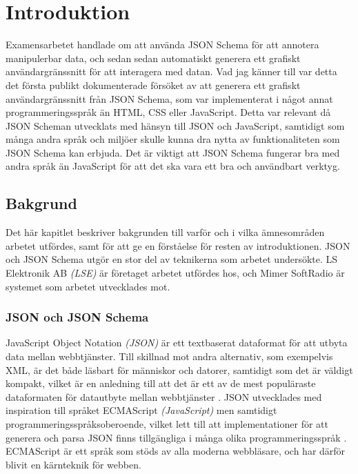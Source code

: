 \chapter{Introduktion}

Examensarbetet handlade om att använda JSON Schema för att annotera manipulerbar data, och sedan sedan automatiskt generera ett grafiskt användargränssnitt för att interagera med datan. Vad jag känner till var detta det första publikt dokumenterade försöket av att generera ett grafiskt användargränssnitt från JSON Schema, som var implementerat i något annat programmeringsspråk än HTML, CSS eller JavaScript. Detta var relevant då JSON Scheman utvecklats med hänsyn till JSON och JavaScript, samtidigt som många andra språk och miljöer skulle kunna dra nytta av funktionaliteten som JSON Schema kan erbjuda. Det är viktigt att JSON Schema fungerar bra med andra språk än JavaScript för att det ska vara ett bra och användbart verktyg.

\section{Bakgrund}
\label{sec:intro:bakgrund}
Det här kapitlet beskriver bakgrunden till varför och i vilka ämnesområden arbetet utfördes, samt för att ge en förståelse för resten av introduktionen. JSON och JSON Schema utgör en stor del av teknikerna som arbetet undersökte. LS Elektronik AB \textit{(LSE)} är företaget arbetet utfördes hos, och Mimer SoftRadio är systemet som arbetet utvecklades mot.

\subsection{JSON och JSON Schema}
\label{sec:intro:json}
JavaScript Object Notation \textit{(JSON)} är ett textbaserat dataformat för att utbyta data mellan webbtjänster. Till skillnad mot andra alternativ, som exempelvis XML, är det både läsbart för människor och datorer, samtidigt som det är väldigt kompakt, vilket är en anledning till att det är ett av de mest populäraste dataformaten för datautbyte mellan webbtjänster \cite{Pezoa2016}. JSON utvecklades med inspiration till språket ECMAScript \textit{(JavaScript)} men samtidigt programmeringsspråksoberoende, vilket lett till att implementationer för att generera och parsa JSON finns tillgängliga i många olika programmeringsspråk \cite{ECMA2013}. ECMAScript är ett språk som stöds av alla moderna webbläsare, och har därför blivit en kärnteknik för webben.

